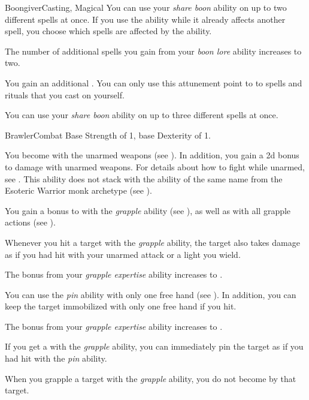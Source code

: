 \begin{feat}{Boongiver}{Casting, Magical}
         You can use your \textit{share boon} ability on up to two different spells at once.
        If you use the ability while it already affects another spell, you choose which spells are affected by the ability.

         The number of additional  spells you gain from your \textit{boon lore} ability increases to two.

         You gain an additional .
        You can only use this attunement point to  to spells and rituals that you cast on yourself.

         You can use your \textit{share boon} ability on up to three different spells at once.
    \end{feat}

    \begin{feat}{Brawler}{Combat}
        \featpre Base Strength of 1, base Dexterity of 1.

         You become  with the unarmed weapons  (see ).
        In addition, you gain a \plus2d bonus to damage with unarmed weapons.
        For details about how to fight while unarmed, see .
        This ability does not stack with the ability of the same name from the Esoteric Warrior monk archetype (see ).

         You gain a  bonus to  with the \textit{grapple} ability (see ), as well as with all grapple actions (see ).

         Whenever you hit a target with the \textit{grapple} ability, the target also takes damage as if you had hit with your unarmed attack or a light  you wield.

         The bonus from your \textit{grapple expertise} ability increases to .

         You can use the \textit{pin} ability with only one free hand (see ).
        In addition, you can keep the target immobilized with only one free hand if you hit.

         The bonus from your \textit{grapple expertise} ability increases to .

         If you get a  with the \textit{grapple} ability, you can immediately pin the target as if you had hit with the \textit{pin} ability.

         When you grapple a target with the \textit{grapple} ability, you do not become  by that target.
    \end{feat}

